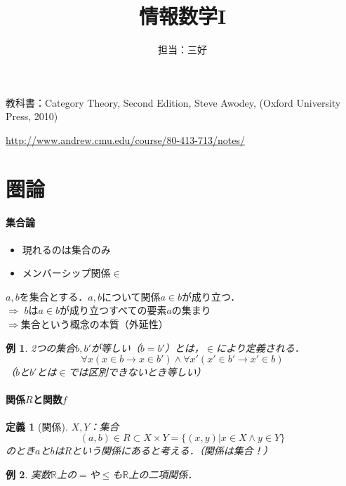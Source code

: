 \documentclass[dvipdfmx,a4j,10pt]{jsarticle}
\title{情報数学I}
\author{担当：三好}
\theoremstyle{mystyle1}
\theoremstyle{mystyle2}
\newtheorem{dfn*}{定義}
\newtheorem{example}{例}
\begin{document}
\maketitle
教科書：Category Theory, Second Edition, Steve Awodey, (Oxford University Press, 2010)

\url{http://www.andrew.cmu.edu/course/80-413-713/notes/}

\tableofcontents%

\newpage

\section{圏論}

\paragraph{集合論}

\begin{itemize}
    \item 現れるのは集合のみ
    \item メンバーシップ関係$\in$
\end{itemize}

$a,b$を集合とする．$a,b$について関係$a\in b$が成り立つ．\\
$\Rightarrow$ $b$は$a\in b$が成り立つすべての要素$a$の集まり\\
$\Rightarrow$集合という概念の本質（外延性）

\begin{example}
    2つの集合$b,b'$が等しい（$b=b'$）とは，$\in$により定義される．
    \[
        \forall x(x\in b\to x\in b')\land \forall x'(x'\in b'\to x'\in b)
    \]
    （$b$と$b'$とは$\in$では区別できないとき等しい）
\end{example}

\paragraph{関係$R$と関数$f$}

\begin{dfn*}[関係]

    $X,Y$：集合
    \[
        (a,b)\in R\subset X\times Y=\{(x,y)|x\in X\land y\in Y\}
    \]
    のとき$a$と$b$は$R$という関係にあると考える．（関係は集合！）
\end{dfn*}

\begin{example}
    実数$\mathbb{R}$上の$=$や$\leq$も$\mathbb{R}$上の二項関係．
\end{example}
\end{document}

